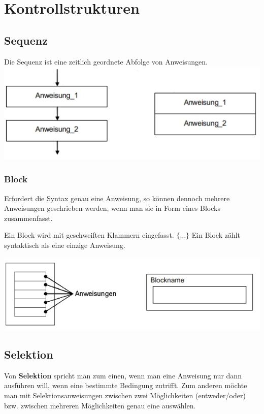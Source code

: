 \section{Kontrollstrukturen }
	\begin{minipage}[t]{9 cm}
		\subsection{Sequenz }
			Die Sequenz ist eine zeitlich geordnete Abfolge von Anweisungen. \\
				\includegraphics[width=1\textwidth]{pics/Sequenz.jpg}	
			
	\end{minipage}
	\begin{minipage}[t]{9 cm}
			\subsubsection{Block}
				\begin{compactitem}
					\item Erfordert die Syntax genau eine Anweisung, so können dennoch mehrere Anweisungen geschrieben werden, wenn man sie in Form eines Blocks zusammenfasst.
					\item Ein Block wird mit geschweiften Klammern eingefasst. $\{ \dots \}$ Ein Block zählt syntaktisch als eine einzige Anweisung.
				\end{compactitem}
				\includegraphics[width=1\textwidth]{pics/Block.jpg}
	\end{minipage}	
		
	\subsection{Selektion }
		Von \textbf{Selektion} spricht man zum einen, wenn man eine Anweisung nur dann ausführen will, wenn eine bestimmte Bedingung zutrifft. Zum anderen möchte man mit Selektionsanweisungen zwischen zwei Möglichkeiten (entweder/oder) bzw. zwischen mehreren Möglichkeiten genau eine auswählen.
		
